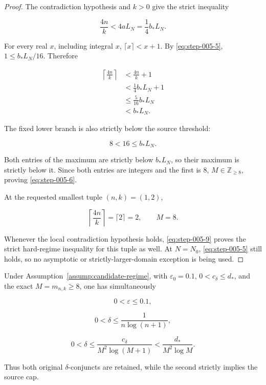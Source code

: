 \begin{proof}
The contradiction hypothesis and \(k>0\) give the strict inequality

\[
\frac{4n}{k}
<4aL_N
=\frac14 b_*L_N.
\tag{S5.7}\label{eq:step-005-7}
\]

For every real \(x\), including integral \(x\),
\(\lceil x\rceil<x+1\). By \eqref{eq:step-005-5}, \(1\le b_*L_N/16\). Therefore

\[
\begin{aligned}
\left\lceil\frac{4n}{k}\right\rceil
&<\frac{4n}{k}+1\\
&<\frac14b_*L_N+1\\
&\le\frac{5}{16}b_*L_N\\
&<b_*L_N.
\end{aligned}
\tag{S5.8}\label{eq:step-005-8}
\]

The fixed lower branch is also strictly below the source threshold:

\[
8<16\le b_*L_N.
\tag{S5.9}\label{eq:step-005-9}
\]

Both entries of the maximum are strictly below \(b_*L_N\), so their
maximum is strictly below it. Since both entries are integers and the first
is 8, \(M\in\mathbb Z_{\ge8}\), proving \eqref{eq:step-005-6}.

At the requested smallest tuple \((n,k)=(1,2)\),

\[
\left\lceil\frac{4n}{k}\right\rceil=\lceil2\rceil=2,
\qquad M=8.
\]

Whenever the local contradiction hypothesis holds, \eqref{eq:step-005-9} proves the strict
hard-regime inequality for this tuple as well. At \(N=N_0\), \eqref{eq:step-005-5} still
holds, so no asymptotic or strictly-larger-domain exception is being used.
\end{proof}

\begin{lemma}\label{lem:step-005-privacy-cap}
Under Assumption~\ref{assump:candidate-regime}, with
\(\varepsilon_0=0.1\), \(0<c_\delta\le d_*\), and the exact
\(M=m_{n,k}\ge8\), one has simultaneously

\[
0<\varepsilon\le0.1,
\tag{S5.10}\label{eq:step-005-10}
\]

\[
0<\delta\le\frac{1}{n\log(n+1)},
\tag{S5.11}\label{eq:step-005-11}
\]

\[
0<\delta\le\frac{c_\delta}{M^2\log(M+1)}
<\frac{d_*}{M^2\log M}.
\tag{S5.12}\label{eq:step-005-12}
\]

Thus both original \(\delta\)-conjuncts are retained, while the second
strictly implies the source cap.
\end{lemma}

